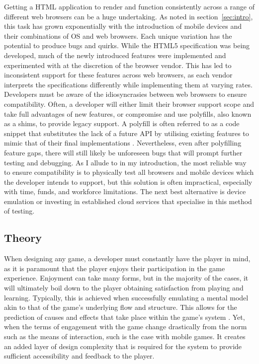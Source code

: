 \documentclass[final]{cmpreport}
\begin{document}
Getting a HTML application to render and function consistently across a range of different web browsers can be a huge undertaking. As noted in section~\ref{sec:intro}, this task has grown exponentially with the introduction of mobile devices and their combinations of OS and web browsers. Each unique variation has the potential to produce bugs and quirks. While the HTML5 specification was being developed, much of the newly introduced features were implemented and experimented with at the discretion of the browser vendor. This has led to inconsistent support for these features across web browsers, as each vendor interprets the specifications differently while implementing them at varying rates. Developers must be aware of the idiosyncrasies between web browsers to ensure compatibility. Often, a developer will either limit their browser support scope and take full advantages of new features, or compromise and use polyfills, also known as a shims, to provide legacy support. A polyfill is often referred to as a code snippet that substitutes the lack of a future API by utilising existing features to mimic that of their final implementations \cite{Lawson}. Nevertheless, even after polyfilling feature gaps, there will still likely be unforeseen bugs that will prompt further testing and debugging. As I allude to in my introduction, the most reliable way to ensure compatibility is to physically test all browsers and mobile devices which the developer intends to support, but this solution is often impractical, especially with time, funds, and workforce limitations. The next best alternative is device emulation or investing in established cloud services that specialise in this method of testing.

\subsection{Theory}
When designing any game, a developer must constantly have the player in mind, as it is paramount that the player enjoys their participation in the game experience. Enjoyment can take many forms, but in the majority of the cases, it will ultimately boil down to the player obtaining satisfaction from playing and learning. Typically, this is achieved when successfully emulating a mental model akin to that of the game's underlying flow and structure. This allows for the prediction of causes and effects that take place within the game's system \cite{Cook}. Yet, when the terms of engagement with the game change drastically from the norm such as the means of interaction, such is the case with mobile games. It creates an added layer of design complexity that is required for the system to provide sufficient accessibility and feedback to the player.
\end{document}
